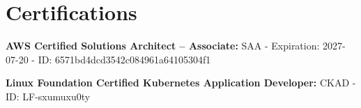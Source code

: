 \documentclass[letterpaper,11pt]{article}
\newcommand{\resumeSubHeadingListStart}{\begin{itemize}[leftmargin=0.15in, label={}]}
\newcommand{\resumeSubHeadingListEnd}{\end{itemize}}
\begin{document}




\section{Certifications}
  \vspace{2pt}
  \resumeSubHeadingListStart
    \small{\item{
        \textbf{AWS Certified Solutions Architect – Associate:}{ SAA - Expiration: 2027-07-20 - ID: 6571bd4dcd3542c084961a64105304f1} \\ \vspace{3pt}

        \textbf{Linux Foundation Certified Kubernetes Application Developer:}{ CKAD - ID: LF-sxumuxu0ty}
    }}
  \resumeSubHeadingListEnd




        
\end{document}
